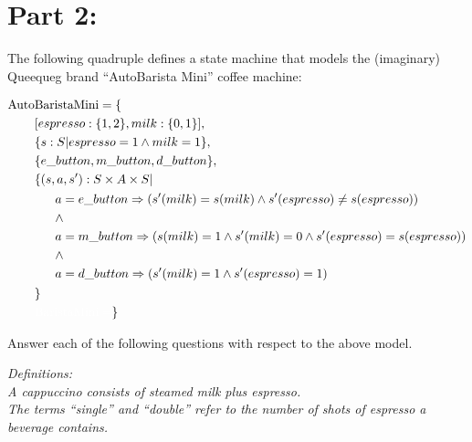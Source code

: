 \documentclass[12pt,fleqn]{article}
\begin{document}
\clearpage

\section*{\sc Part 2:}

The following quadruple defines a state machine that models the (imaginary) Queequeg brand ``AutoBarista Mini'' coffee machine:

\begin{equation*}\begin{split}
\mathrm{Auto}&\mathrm{BaristaMini} = \{\\
&[ espresso : \{ 1, 2 \}, milk : \{ 0, 1 \} ],\\
&\{ s: S | espresso = 1 \wedge milk = 1 \},\\
&\{ e\_button, m\_button, d\_button\},\\
&\{(s,a,s'): S\times A\times S | \\
&\begin{split}
~~~~~&a = e\_button \Rightarrow (s'(milk)=s(milk) \wedge s'(espresso)\neq s(espresso) )\\
&\wedge\\
&a = m\_button \Rightarrow (s(milk)=1 \wedge s'(milk)=0 \wedge s'(espresso)=s(espresso))\\
&\wedge\\
&a = d\_button \Rightarrow (s'(milk)=1 \wedge s'(espresso)=1)
\end{split}\\
&\}\\
&\color{white}\mathrm{BaristaMini} = \color{black}\}
\end{split}\end{equation*}

Answer each of the following questions with respect to the above model.

\vspace*{2ex}

{\em Definitions:\\[2ex]
A cappuccino consists of steamed milk plus espresso.\\[1ex]
The terms ``single'' and ``double'' refer to the number of shots of espresso a beverage contains.}

\clearpage
\end{document}

